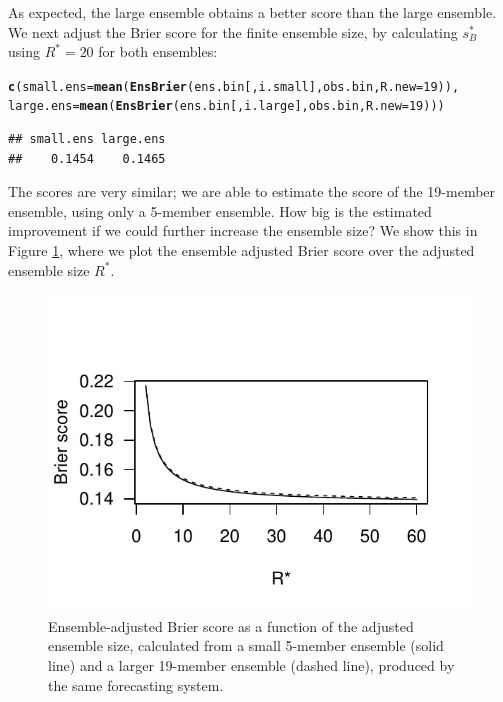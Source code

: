 \documentclass[article]{jss}\usepackage{graphicx, color}
\makeatletter
\def\maxwidth{ %
  \ifdim\Gin@nat@width>\linewidth
    \linewidth
  \else
    \Gin@nat@width
  \fi
}
\newcommand{\hlfunctioncall}[1]{\textcolor[rgb]{0,0.501960784313725,0.752941176470588}{\textbf{#1}}}%
\newenvironment{kframe}{%
 \def\at@end@of@kframe{}%
 \ifinner\ifhmode%
  \def\at@end@of@kframe{\end{minipage}}%
  \begin{minipage}{\columnwidth}%
 \fi\fi%
 \def\FrameCommand##1{\hskip\@totalleftmargin \hskip-\fboxsep
 \colorbox{shadecolor}{##1}\hskip-\fboxsep
     \hskip-\linewidth \hskip-\@totalleftmargin \hskip\columnwidth}%
 \MakeFramed {\advance\hsize-\width
   \@totalleftmargin\z@ \linewidth\hsize
   \@setminipage}}%
 {\par\unskip\endMakeFramed%
 \at@end@of@kframe}
\newenvironment{knitrout}{}{} %
\makeatother
\begin{document}
As expected, the large ensemble obtains a better score than the large ensemble.
We next adjust the Brier score for the finite ensemble size, by calculating $s_{B}^*$ using $R^*=20$ for both ensembles:

\begin{knitrout}
\color{fgcolor}\begin{kframe}
\begin{alltt}
\hlfunctioncall{c}(small.ens=\hlfunctioncall{mean}(\hlfunctioncall{EnsBrier}(ens.bin[, i.small], obs.bin, R.new=19)), 
  large.ens=\hlfunctioncall{mean}(\hlfunctioncall{EnsBrier}(ens.bin[, i.large], obs.bin, R.new=19)))
\end{alltt}
\begin{verbatim}
## small.ens large.ens 
##    0.1454    0.1465
\end{verbatim}
\end{kframe}
\end{knitrout}


The scores are very similar; we are able to estimate the score of the 19-member ensemble, using only a 5-member ensemble.
How big is the estimated improvement if we could further increase the ensemble size?
We show this in Figure \ref{fig:ens-brier}, where we plot the ensemble adjusted Brier score over the adjusted ensemble size $R^*$.


\begin{figure}
\begin{center}
\begin{knitrout}
\color{fgcolor}
\includegraphics[width=\maxwidth]{figure/ens-brier} 

\end{knitrout}

\caption{Ensemble-adjusted Brier score as a function of the adjusted ensemble size, calculated from a small 5-member ensemble (solid line) and a larger 19-member ensemble (dashed line), produced by the same forecasting system.}
\label{fig:ens-brier}
\end{center}
\end{figure}
\end{document}
